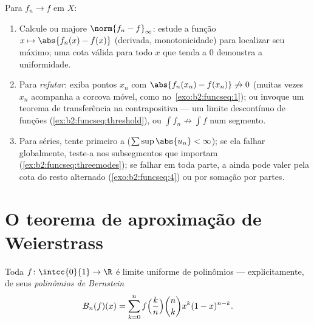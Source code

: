\begin{method}\label{met:b2:funcseq:uniform}
Para $f_n \to f$  em $X$:
\begin{enumerate}
  \item Calcule ou majore $\norm{f_n - f}_\infty$: estude a
        função $x \mapsto \abs{f_n(x) - f(x)}$ (derivada,
        monotonicidade) para localizar seu máximo; uma cota válida para
        todo $x$ que tenda a $0$ demonstra a uniformidade.
  \item Para \emph{refutar}: exiba pontos $x_n$ com
        $\abs{f_n(x_n) - f(x_n)} \not\to 0$ (muitas vezes $x_n$ acompanha
        a corcova móvel, como no~\cref{exo:b2:funcseq:1}); ou
        invoque um teorema de transferência na contrapositiva --- um
        limite descontínuo de funções 
        (\cref{ex:b2:funcseq:threshold}), ou $\int f_n
        \not\to \int f$ num segmento.
  \item Para séries, tente primeiro a 
        ($\sum\sup\abs{u_n} < \infty$); se ela falhar globalmente,
        teste-a nos subsegmentos que importam
        (\cref{ex:b2:funcseq:threemodes}); se falhar
        em toda parte, a  ainda pode valer pela
        cota do resto alternado
        (\cref{exo:b2:funcseq:4}) ou por somação por partes.
\end{enumerate}
\end{method}

\section{O teorema de aproximação de Weierstrass}

\begin{theorem}\label{thm:b2:funcseq:weierstrass}
Toda $f \colon \intcc{0}{1} \to \R$  é limite uniforme
de polinômios --- explicitamente, de seus \emph{polinômios de
Bernstein}
\[
B_n(f)(x) = \sum_{k=0}^{n} f\Bigl(\frac kn\Bigr)\binom nk x^k
(1-x)^{n-k} .
\]
\end{theorem}

